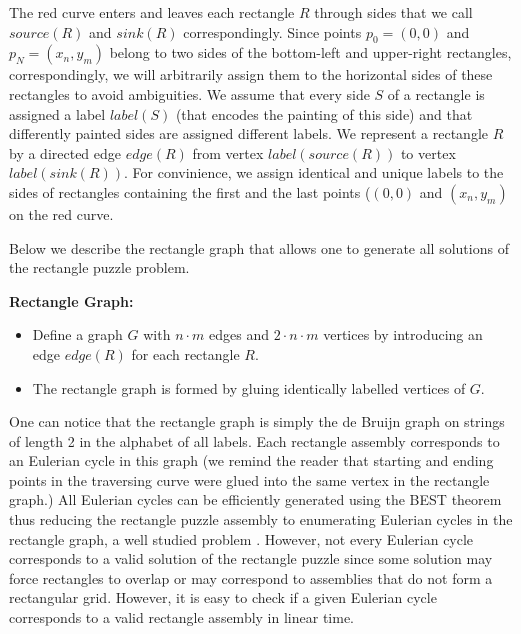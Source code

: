 \documentclass[a4paper]{article}
\begin{document}

The red curve enters and leaves each rectangle $R$ through sides that we call $source(R)$  and $sink(R)$ correspondingly.  Since points $p_0=(0,0)$ and $p_N=(x_n,y_m)$ belong to two sides of the bottom-left and upper-right rectangles, correspondingly, we will arbitrarily assign them to the horizontal sides of these rectangles to avoid ambiguities. 
We assume that every side $S$ of a rectangle is assigned a label $label(S)$ (that encodes the painting of this side) and that differently painted sides are assigned different labels.  We represent a rectangle $R$ by a directed edge $edge(R)$ from vertex $label(source(R))$ to vertex $label(sink(R))$.  For convinience, we assign identical and unique labels to the sides of rectangles containing the first and the last points ($(0,0)$ and $(x_n,y_m)$ on the red curve. 

Below we describe the rectangle graph that allows one to generate all solutions of the rectangle puzzle problem. 

\textbf{Rectangle Graph:}
\begin{itemize}
\item  Define a graph $G$ with $n \cdot m$ edges and $2 \cdot n \cdot m$ vertices by introducing an edge $edge(R)$ for each rectangle $R$. 
\item The rectangle graph is formed by gluing identically labelled vertices of $G$.
\end{itemize}
One can notice that the rectangle graph is simply the de Bruijn graph on strings of length 2 in the alphabet of all labels. Each rectangle assembly corresponds to an Eulerian  cycle in this graph (we remind the reader that starting and ending points in the traversing curve were glued into the same vertex in the rectangle graph.) 
All 
Eulerian cycles  can be efficiently generated using the BEST \cite{best} theorem thus reducing the rectangle puzzle
assembly to enumerating Eulerian cycles in the rectangle graph, a well studied problem \cite{abrham80}. 
However, not every Eulerian cycle corresponds to a valid solution of the rectangle puzzle since some solution may force rectangles to overlap or may correspond to assemblies that do not form a rectangular grid. However, it is easy to check if a given Eulerian cycle corresponds to a valid rectangle assembly in linear time. 
\end{document}
